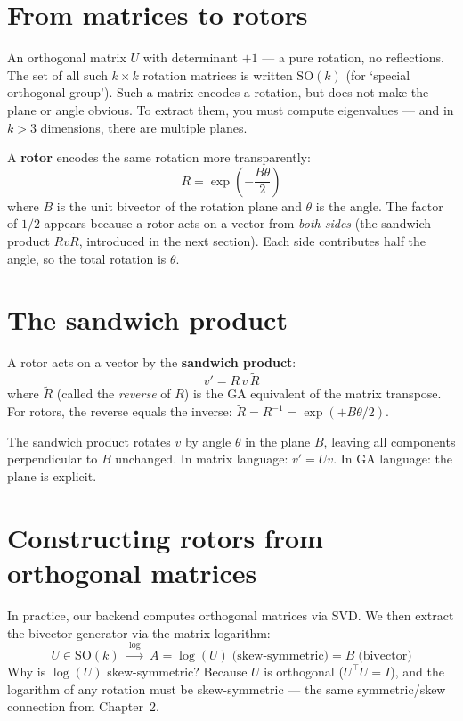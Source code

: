 \documentclass[11pt, twoside, openright]{memoir}
\newcommand{\gp}{\,}              %
\newcommand{\rev}[1]{\widetilde{#1}} %
\begin{document}
\section{From matrices to rotors}

An orthogonal matrix $U$ with determinant $+1$ --- a pure rotation, no
reflections.  The set of all such $k \times k$ rotation matrices is
written $\mathrm{SO}(k)$ (for `special orthogonal group').
Such a matrix encodes a rotation, but does not make the plane or angle
obvious.  To extract them, you must compute eigenvalues --- and in
$k > 3$ dimensions, there are multiple planes.

A \textbf{rotor} encodes the same rotation more transparently:
\[
  R = \exp\!\left(-\frac{B \theta}{2}\right)
\]
where $B$ is the unit bivector of the rotation plane and $\theta$ is the
angle.  The factor of $1/2$ appears because a rotor acts on a vector from
\emph{both sides} (the sandwich product $Rv\rev{R}$, introduced in the
next section).  Each side contributes half the angle, so the total
rotation is $\theta$.

\section{The sandwich product}

A rotor acts on a vector by the \textbf{sandwich product}:
\[
  v' = R \gp v \gp \rev{R}
\]
where $\widetilde{R}$ (called the \emph{reverse} of $R$) is the GA
equivalent of the matrix transpose.  For rotors, the reverse equals the
inverse: $\widetilde{R} = R^{-1} = \exp(+B\theta/2)$.

\begin{keyidea}
The sandwich product rotates $v$ by angle $\theta$ in the plane $B$,
leaving all components perpendicular to $B$ unchanged.  In matrix
language: $v' = Uv$.  In GA language: the plane is explicit.
\end{keyidea}

\section{Constructing rotors from orthogonal matrices}

In practice, our backend computes orthogonal matrices via SVD.  We then
extract the bivector generator via the matrix logarithm:
\[
  U \in \mathrm{SO}(k) \;\xrightarrow{\;\log\;}\; A = \log(U) \;\text{(skew-symmetric)} = B \;\text{(bivector)}
\]
Why is $\log(U)$ skew-symmetric?  Because $U$ is orthogonal
($U^\top U = I$), and the logarithm of any rotation must be
skew-symmetric --- the same symmetric/skew connection from Chapter~2.
\end{document}

